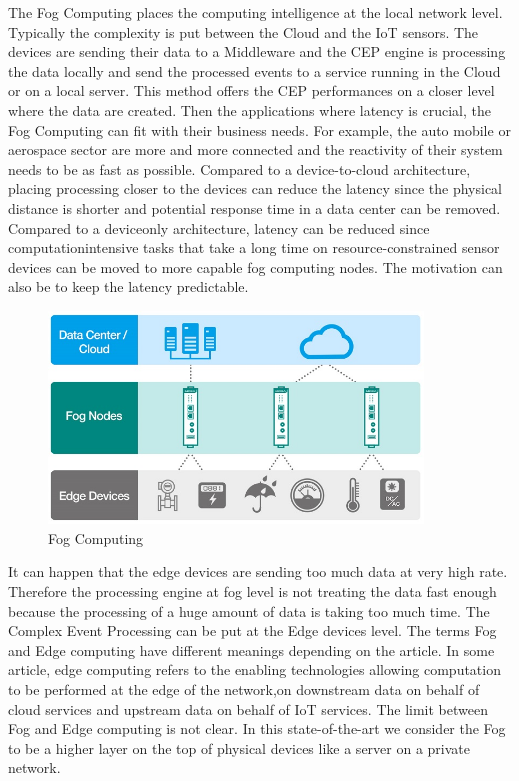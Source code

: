 \documentclass[11pt]{article}
\begin{document}
The Fog Computing places the computing intelligence at the local network level. Typically the complexity is put between the Cloud and the IoT sensors. The devices are sending their data to a Middleware and the CEP engine is processing the data locally and send the processed events to a service running in the Cloud or on a local server. This method offers the CEP performances on a closer level where the data are created. Then the applications where latency is crucial, the Fog Computing can fit with their business needs. For example, the auto mobile or aerospace sector are more and more connected and the reactivity of their system needs to be as fast as possible. Compared to a device-to-cloud architecture, placing processing closer to the devices can reduce the latency since the physical distance is shorter and potential response time in a data center can be removed. Compared to a deviceonly architecture, latency can be reduced since computationintensive tasks that take a long time on resource-constrained sensor devices can be moved to more capable fog computing nodes. The motivation can also be to keep the latency predictable.\cite{7248934}

\begin{figure}[H]
	\includegraphics[width=\textwidth,height=160pt]{assets/Fog_Computing.jpg}
	\caption{Fog Computing}
	\label{fig:Fog-Computing}
\end{figure}

It can happen that the edge devices are sending too much data at very high rate. Therefore the processing engine at fog level is not treating the data fast enough because the processing of a huge amount of data is taking too much time. The Complex Event Processing can be put at the Edge devices level. The terms Fog and Edge computing have different meanings depending on the article. In some article, edge computing refers to the enabling technologies allowing computation to be performed at the edge of the network,on downstream data on behalf of cloud services and upstream data on behalf of IoT services.\cite{Edge Computing - Vision and Challenges} The limit between Fog and Edge computing is not clear. In this state-of-the-art we consider the Fog to be a higher layer on the top of physical devices like a server on a private network. 
\end{document}
